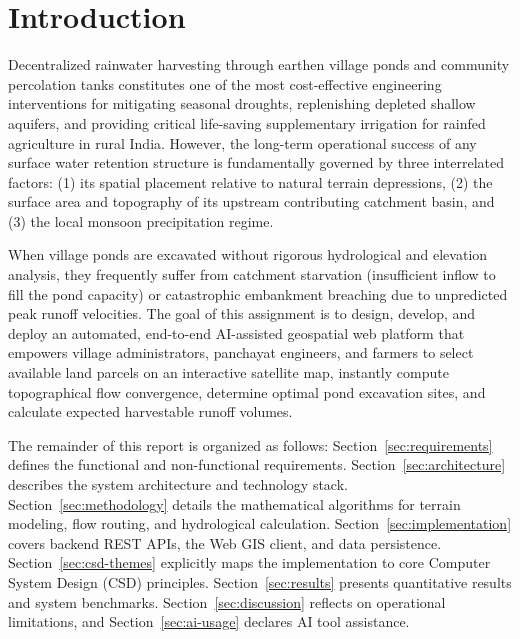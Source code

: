 \documentclass[manuscript,screen,review]{acmart}
\begin{document}
\section{Introduction}
\label{sec:intro}
Decentralized rainwater harvesting through earthen village ponds and community percolation tanks constitutes one of the most cost-effective engineering interventions for mitigating seasonal droughts, replenishing depleted shallow aquifers, and providing critical life-saving supplementary irrigation for rainfed agriculture in rural India. However, the long-term operational success of any surface water retention structure is fundamentally governed by three interrelated factors: (1) its spatial placement relative to natural terrain depressions, (2) the surface area and topography of its upstream contributing catchment basin, and (3) the local monsoon precipitation regime.

When village ponds are excavated without rigorous hydrological and elevation analysis, they frequently suffer from catchment starvation (insufficient inflow to fill the pond capacity) or catastrophic embankment breaching due to unpredicted peak runoff velocities. The goal of this assignment is to design, develop, and deploy an automated, end-to-end AI-assisted geospatial web platform that empowers village administrators, panchayat engineers, and farmers to select available land parcels on an interactive satellite map, instantly compute topographical flow convergence, determine optimal pond excavation sites, and calculate expected harvestable runoff volumes.

The remainder of this report is organized as follows: Section~\ref{sec:requirements} defines the functional and non-functional requirements. Section~\ref{sec:architecture} describes the system architecture and technology stack. Section~\ref{sec:methodology} details the mathematical algorithms for terrain modeling, flow routing, and hydrological calculation. Section~\ref{sec:implementation} covers backend REST APIs, the Web GIS client, and data persistence. Section~\ref{sec:csd-themes} explicitly maps the implementation to core Computer System Design (CSD) principles. Section~\ref{sec:results} presents quantitative results and system benchmarks. Section~\ref{sec:discussion} reflects on operational limitations, and Section~\ref{sec:ai-usage} declares AI tool assistance.
\end{document}
